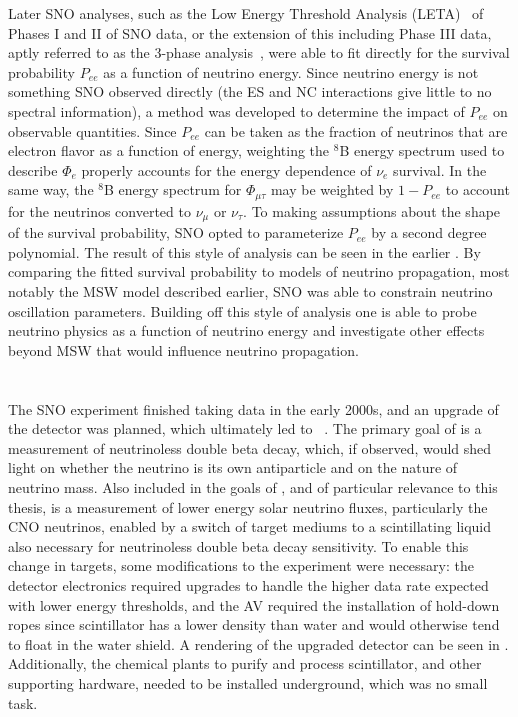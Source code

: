 Later SNO analyses, such as the Low Energy Threshold Analysis (LETA)~\cite{leta} of Phases I and II of SNO data, or the extension of this including Phase III data, aptly referred to as the 3-phase analysis~\cite{3phase}, were able to fit directly for the survival probability $P_{ee}$ as a function of neutrino energy.
Since neutrino energy is not something SNO observed directly (the ES and NC interactions give little to no spectral information), a method was developed to determine the impact of $P_{ee}$ on observable quantities.
Since $P_{ee}$ can be taken as the fraction of neutrinos that are electron flavor as a function of energy, weighting the $^8$B energy spectrum used to describe $\Phi_e$ properly accounts for the energy dependence of $\nu_e$ survival.
In the same way, the $^8$B energy spectrum for $\Phi_{\mu\tau}$ may be weighted by $1-P_{ee}$ to account for the neutrinos converted to $\nu_\mu$ or $\nu_\tau$.
To making assumptions about the shape of the survival probability, SNO opted to parameterize $P_{ee}$ by a second degree polynomial.
The result of this style of analysis can be seen in the earlier .
By comparing the fitted survival probability to models of neutrino propagation, most notably the MSW model described earlier, SNO was able to constrain neutrino oscillation parameters.
Building off this style of analysis one is able to probe neutrino physics as a function of neutrino energy and investigate other effects beyond MSW that would influence neutrino propagation.

\section{\texorpdfstring{\snop}{SNO+}}

The SNO experiment finished taking data in the early 2000s, and an upgrade of the detector was planned, which ultimately led to {\snop}~\cite{snop}.
The primary goal of {\snop} is a measurement of neutrinoless double beta decay, which, if observed, would shed light on whether the neutrino is its own antiparticle and on the nature of neutrino mass.
Also included in the goals of {\snop}, and of particular relevance to this thesis, is a measurement of lower energy solar neutrino fluxes, particularly the CNO neutrinos, enabled by a switch of target mediums to a scintillating liquid also necessary for neutrinoless double beta decay sensitivity.
To enable this change in targets, some modifications to the experiment were necessary: the detector electronics required upgrades to handle the higher data rate expected with lower energy thresholds, and the AV required the installation of hold-down ropes since scintillator has a lower density than water and would otherwise tend to float in the water shield.
A rendering of the upgraded detector can be seen in .
Additionally, the chemical plants to purify and process scintillator, and other supporting hardware, needed to be installed underground, which was no small task.

